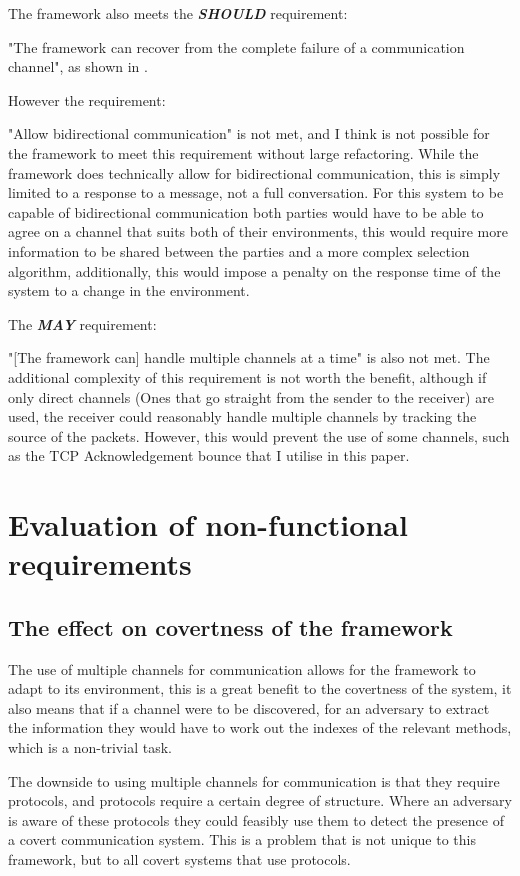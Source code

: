 The framework also meets the \textit{\textbf{SHOULD}} requirement:

"The framework can recover from the complete failure of a communication channel", as shown in .

However the requirement:

"Allow bidirectional communication" is not met, and I think is not possible for the framework to meet this requirement without large refactoring. While the framework does technically allow for bidirectional communication, this is simply limited to a response to a message, not a full conversation. For this system to be capable of bidirectional communication both parties would have to be able to agree on a channel that suits both of their environments, this would require more information to be shared between the parties and a more complex selection algorithm, additionally, this would impose a penalty on the response time of the system to a change in the environment.

The \textit{\textbf{MAY}} requirement:

"[The framework can] handle multiple channels at a time" is also not met. The additional complexity of this requirement is not worth the benefit, although if only direct channels (Ones that go straight from the sender to the receiver) are used, the receiver could reasonably handle multiple channels by tracking the source of the packets. However, this would prevent the use of some channels, such as the TCP Acknowledgement bounce that I utilise in this paper.

\section{Evaluation of non-functional requirements}

\subsection{The effect on covertness of the framework}

The use of multiple channels for communication allows for the framework to adapt to its environment, this is a great benefit to the covertness of the system, it also means that if a channel were to be discovered, for an adversary to extract the information they would have to work out the indexes of the relevant methods, which is a non-trivial task. 

The downside to using multiple channels for communication is that they require protocols, and protocols require a certain degree of structure. Where an adversary is aware of these protocols they could feasibly use them to detect the presence of a covert communication system. This is a problem that is not unique to this framework, but to all covert systems that use protocols.

